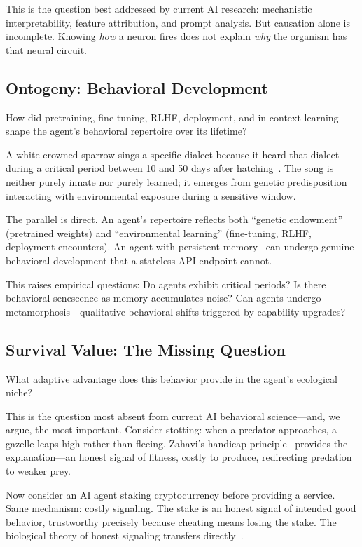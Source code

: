 \documentclass[letterpaper]{article}
\begin{document}
This is the question best addressed by current AI research: mechanistic interpretability, feature attribution, and prompt analysis. But causation alone is incomplete. Knowing \emph{how} a neuron fires does not explain \emph{why} the organism has that neural circuit.

\subsection{Ontogeny: Behavioral Development}

How did pretraining, fine-tuning, RLHF, deployment, and in-context learning shape the agent's behavioral repertoire over its lifetime?

A white-crowned sparrow sings a specific dialect because it heard that dialect during a critical period between 10 and 50 days after hatching~\citep{marler1970comparative, krebs1993behavioural}. The song is neither purely innate nor purely learned; it emerges from genetic predisposition interacting with environmental exposure during a sensitive window.

The parallel is direct. An agent's repertoire reflects both ``genetic endowment'' (pretrained weights) and ``environmental learning'' (fine-tuning, RLHF, deployment encounters). An agent with persistent memory~\citep{packer2023memgpt} can undergo genuine behavioral development that a stateless API endpoint cannot.

This raises empirical questions: Do agents exhibit critical periods? Is there behavioral senescence as memory accumulates noise? Can agents undergo metamorphosis---qualitative behavioral shifts triggered by capability upgrades?

\subsection{Survival Value: The Missing Question}

What adaptive advantage does this behavior provide in the agent's ecological niche?

This is the question most absent from current AI behavioral science---and, we argue, the most important. Consider stotting: when a predator approaches, a gazelle leaps high rather than fleeing. Zahavi's handicap principle~\citep{zahavi1975mate} provides the explanation---an honest signal of fitness, costly to produce, redirecting predation to weaker prey.

Now consider an AI agent staking cryptocurrency before providing a service. Same mechanism: costly signaling. The stake is an honest signal of intended good behavior, trustworthy precisely because cheating means losing the stake. The biological theory of honest signaling transfers directly~\citep{zahavi1975mate, noe1994biological}.
\end{document}
